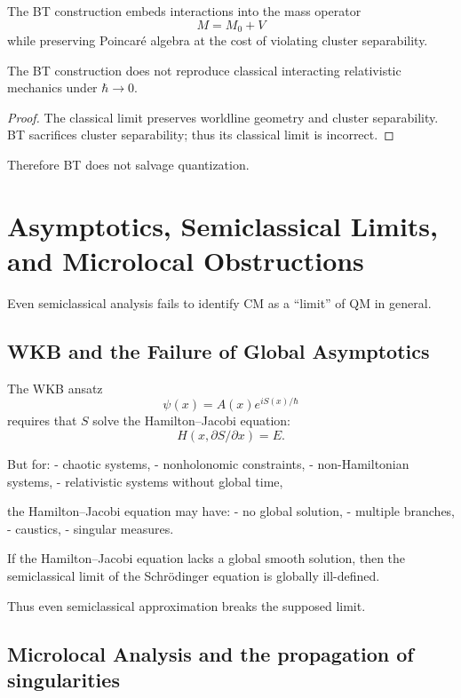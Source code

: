 \documentclass[12pt,oneside]{book}
\begin{document}
The BT construction embeds interactions into the mass operator
\[
M = M_0 + V
\]
while preserving Poincaré algebra at the cost of violating cluster separability.

\begin{theorem}
The BT construction does not reproduce classical interacting relativistic mechanics under $\hbar\to 0$.
\end{theorem}

\begin{proof}
The classical limit preserves worldline geometry and cluster separability.
BT sacrifices cluster separability; thus its classical limit is incorrect.
\end{proof}

Therefore BT does not salvage quantization.


\chapter{Asymptotics, Semiclassical Limits, and Microlocal Obstructions}

Even semiclassical analysis fails to identify CM as a “limit” of QM in general.

\section{WKB and the Failure of Global Asymptotics}

The WKB ansatz
\[
\psi(x) = A(x) e^{iS(x)/\hbar}
\]
requires that $S$ solve the Hamilton–Jacobi equation:
\[
H(x,\partial S/\partial x) = E.
\]

But for:
- chaotic systems,
- nonholonomic constraints,
- non-Hamiltonian systems,
- relativistic systems without global time,

the Hamilton–Jacobi equation may have:
- no global solution,
- multiple branches,
- caustics,
- singular measures.

\begin{theorem}
If the Hamilton–Jacobi equation lacks a global smooth solution, then the semiclassical limit of the Schrödinger equation is globally ill-defined.
\end{theorem}

Thus even semiclassical approximation breaks the supposed limit.

\section{Microlocal Analysis and the propagation of singularities}
\end{document}
